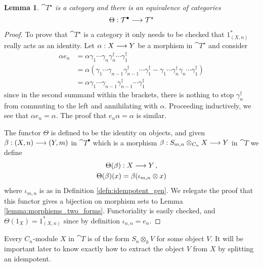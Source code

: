 \documentclass[english,letter paper,12pt,leqno]{article}
\newtheorem{lemma}[theorem]{Lemma}
\theoremstyle{example}
\numberwithin{equation}{section}
\def\ferm{\gamma}
\def\fermc{\gamma^\dagger}
\begin{document}
\begin{lemma}\label{lemma:equivcliffordthick} $\cat{T}^{\star}$ is a category and there is an equivalence of categories
\[
\Theta: \mathcal{T}^\bullet \longrightarrow \mathcal{T}^{\star}
\]
\end{lemma}
\begin{proof}
To prove that $\cat{T}^{\star}$ is a category it only needs to be checked that $1^*_{(X,n)}$ really acts as an identity. Let $\alpha: X \longrightarrow Y$ be a morphism in $\cat{T}^{\star}$ and consider
\begin{align*}
\alpha e_n &= \alpha \ferm_1 \cdots \ferm_n \fermc_n \cdots \fermc_1\\
&= \alpha \left( \ferm_1 \cdots \ferm_{n-1} \fermc_{n-1} \cdots \fermc_1 - \ferm_1 \cdots \fermc_n \ferm_n \cdots \fermc_1 \right)\\
&= \alpha \ferm_1 \cdots \ferm_{n-1} \fermc_{n-1} \cdots \fermc_1
\end{align*}
since in the second summand within the brackets, there is nothing to stop $\fermc_n$ from commuting to the left and annihilating with $\alpha$. Proceeding inductively, we see that $\alpha e_n = \alpha$. The proof that $e_n \alpha = \alpha$ is similar.

The functor $\Theta$ is defined to be the identity on objects, and given $\beta: (X,n) \longrightarrow (Y,m)$ in $\cat{T}^{\bullet}$ which is a morphism $\beta: S_{m,n} \otimes_{C_n} X \longrightarrow Y$ in $\cat{T}$ we define
\begin{gather*}
\Theta(\beta): X \longrightarrow Y\,,\\
\Theta(\beta)( x ) = \beta( \iota_{m,n} \otimes x )
\end{gather*}
where $\iota_{m,n}$ is as in Definition \ref{defn:idempotent_gen}. We relegate the proof that this functor gives a bijection on morphism sets to Lemma \ref{lemma:morphisms_two_forms}. Functoriality is easily checked, and $\Theta(1_X) = 1^*_{(X,n)}$ since by definition $\iota_{n,n} = e_n$.
\end{proof}

Every $C_n$-module $X$ in $\cat{T}$ is of the form $S_n \otimes_k V$ for some object $V$. It will be important later to know exactly how to extract the object $V$ from $X$ by splitting an idempotent.
\end{document}
